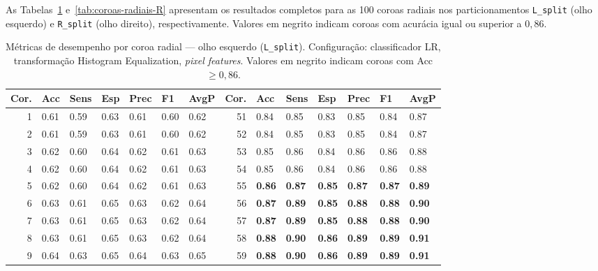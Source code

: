 \documentclass[11pt,a4paper]{article}
\begin{document}
As Tabelas~\ref{tab:coroas-radiais-L} e~\ref{tab:coroas-radiais-R} apresentam os resultados completos para as 100 coroas radiais nos particionamentos \texttt{L\_split} (olho esquerdo) e \texttt{R\_split} (olho direito), respectivamente. Valores em negrito indicam coroas com acurácia igual ou superior a \(0{,}86\).

\begin{table}[htbp]
\centering
\caption{Métricas de desempenho por coroa radial --- olho esquerdo (\texttt{L\_split}). Configuração: classificador LR, transformação Histogram Equalization, \textit{pixel features}. Valores em negrito indicam coroas com Acc $\geq 0{,}86$.}
\label{tab:coroas-radiais-L}
\tiny
\setlength{\tabcolsep}{2.5pt}
\renewcommand{\arraystretch}{1.05}
\begin{tabular}{rllllll@{\hspace{8pt}}rllllll}
\toprule
\textbf{Cor.} & \textbf{Acc} & \textbf{Sens} & \textbf{Esp} & \textbf{Prec} & \textbf{F1} & \textbf{AvgP} &
\textbf{Cor.} & \textbf{Acc} & \textbf{Sens} & \textbf{Esp} & \textbf{Prec} & \textbf{F1} & \textbf{AvgP} \\
\midrule
1 & 0.61 & 0.59 & 0.63 & 0.61 & 0.60 & 0.62 & 51 & 0.84 & 0.85 & 0.83 & 0.85 & 0.84 & 0.87 \\
2 & 0.61 & 0.59 & 0.63 & 0.61 & 0.60 & 0.62 & 52 & 0.84 & 0.85 & 0.83 & 0.85 & 0.84 & 0.87 \\
3 & 0.62 & 0.60 & 0.64 & 0.62 & 0.61 & 0.63 & 53 & 0.85 & 0.86 & 0.84 & 0.86 & 0.86 & 0.88 \\
4 & 0.62 & 0.60 & 0.64 & 0.62 & 0.61 & 0.63 & 54 & 0.85 & 0.86 & 0.84 & 0.86 & 0.86 & 0.88 \\
5 & 0.62 & 0.60 & 0.64 & 0.62 & 0.61 & 0.63 & 55 & \textbf{0.86} & \textbf{0.87} & \textbf{0.85} & \textbf{0.87} & \textbf{0.87} & \textbf{0.89} \\
6 & 0.63 & 0.61 & 0.65 & 0.63 & 0.62 & 0.64 & 56 & \textbf{0.87} & \textbf{0.89} & \textbf{0.85} & \textbf{0.88} & \textbf{0.88} & \textbf{0.90} \\
7 & 0.63 & 0.61 & 0.65 & 0.63 & 0.62 & 0.64 & 57 & \textbf{0.87} & \textbf{0.89} & \textbf{0.85} & \textbf{0.88} & \textbf{0.88} & \textbf{0.90} \\
8 & 0.63 & 0.61 & 0.65 & 0.63 & 0.62 & 0.64 & 58 & \textbf{0.88} & \textbf{0.90} & \textbf{0.86} & \textbf{0.89} & \textbf{0.89} & \textbf{0.91} \\
9 & 0.64 & 0.63 & 0.65 & 0.64 & 0.63 & 0.65 & 59 & \textbf{0.88} & \textbf{0.90} & \textbf{0.86} & \textbf{0.89} & \textbf{0.89} & \textbf{0.91} \\

\end{tabular}
\end{table}
\end{document}
